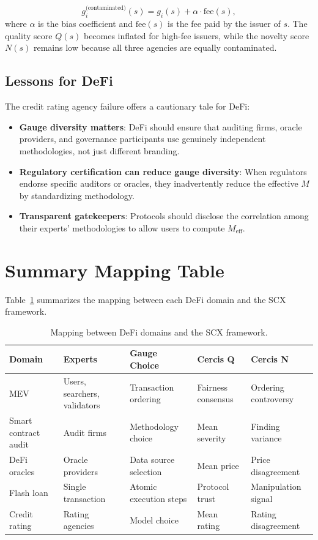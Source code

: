 \documentclass[12pt,a4paper]{article}
\theoremstyle{remark}
\begin{document}
\begin{equation}
g_i^{\text{(contaminated)}}(s) = g_i(s) + \alpha \cdot \text{fee}(s),
\label{eq:gatekeeper_bias}
\end{equation}
where $\alpha$ is the bias coefficient and $\text{fee}(s)$ is the fee paid by
the issuer of $s$. The quality score $Q(s)$ becomes inflated for high-fee
issuers, while the novelty score $N(s)$ remains low because all three agencies
are equally contaminated.

\subsection{Lessons for DeFi}

The credit rating agency failure offers a cautionary tale for DeFi:
\begin{itemize}
\item \textbf{Gauge diversity matters}: DeFi should ensure that auditing firms,
oracle providers, and governance participants use genuinely independent
methodologies, not just different branding.
\item \textbf{Regulatory certification can reduce gauge diversity}: When
regulators endorse specific auditors or oracles, they inadvertently reduce
the effective $M$ by standardizing methodology.
\item \textbf{Transparent gatekeepers}: Protocols should disclose the
correlation among their experts' methodologies to allow users to compute
$M_{\text{eff}}$.
\end{itemize}

\section{Summary Mapping Table}
\label{sec:mapping}

Table~\ref{tab:mapping} summarizes the mapping between each DeFi domain and
the SCX framework.

\begin{table}[htbp]
\centering
\caption{Mapping between DeFi domains and the SCX framework.}
\label{tab:mapping}
\begin{tabular}{lp{2.5cm}p{2.5cm}p{2.5cm}p{2.5cm}}
\toprule
\textbf{Domain} & \textbf{Experts} & \textbf{Gauge Choice} & \textbf{Cercis Q} & \textbf{Cercis N} \\
\midrule
MEV & Users, searchers, validators & Transaction ordering & Fairness consensus & Ordering controversy \\
Smart contract audit & Audit firms & Methodology choice & Mean severity & Finding variance \\
DeFi oracles & Oracle providers & Data source selection & Mean price & Price disagreement \\
Flash loan & Single transaction & Atomic execution steps & Protocol trust & Manipulation signal \\
Credit rating & Rating agencies & Model choice & Mean rating & Rating disagreement \\
\bottomrule
\end{tabular}
\end{table}
\end{document}
